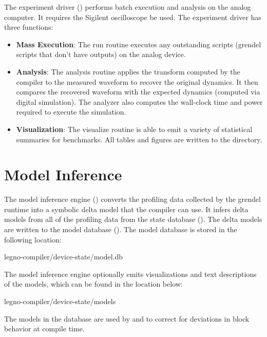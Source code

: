 The experiment driver () performs batch execution and analysis
on the analog computer. It requires the Sigilent oscilloscope be used. The
experiment driver has three functions:

\begin{itemize}
\item\textbf{Mass Execution}: The run routine executes any outstanding
 scripts (grendel scripts that don't have outputs) on the analog
device.

\item\textbf{Analysis}: The analysis routine applies the transform computed by the
compiler to the measured waveform to recover the original dynamics. It then
compares the recovered waveform with the expected dynamics (computed via digital
simulation). The analyzer also computes the wall-clock time and power required to
execute the simulation. 

\item\textbf{Visualization}: The visualize routine is able to emit a variety of
statistical summaries for benchmarks. All tables and figures are written to the
 directory. 
\end{itemize}

\section{Model Inference}

The model inference engine () converts the profiling data
collected by the grendel runtime into a symbolic delta model that the \legno compiler
can use. It infers delta models from all of the profiling data from the state database
(). The delta models are written to the model database
(). The model database is stored in the following location:

\begin{snippet}
  legno-compiler/device-state/model.db
\end{snippet}

The model inference engine optionally emits visualizations and text descriptions
of the models, which can be found in the location below:

\begin{snippet}
  legno-compiler/device-state/models
\end{snippet}

The models in the database are used by \lscale and \srcgen to correct for
deviations in block behavior at compile time.